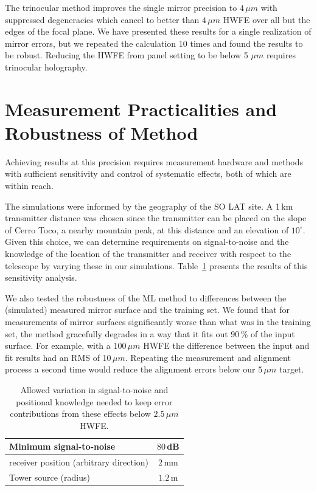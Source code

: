 The trinocular method improves the single mirror precision to $4\,\mu m$ with suppressed degeneracies  which cancel  to better than $4\,\mu m$ HWFE over all but the edges of the focal plane.   We have presented these results for a single realization of mirror errors, but we repeated the calculation 10 times and found the results to be robust.  Reducing the HWFE from panel setting to be below 5 $\mu m$ requires trinocular holography.


\section{Measurement Practicalities and Robustness of Method}
\label{sec:meas_method}
Achieving results at this precision requires measurement hardware and methods with sufficient sensitivity and control of systematic effects, both of which are within reach.

The simulations were informed by the geography of the SO LAT site.  A 1\,km transmitter distance was chosen since the transmitter can be placed on the slope of Cerro Toco, a nearby mountain peak, at this distance and an elevation of $10^\circ$.  Given this choice, we can determine requirements on signal-to-noise and the knowledge of the location of the transmitter and receiver with respect to the telescope by varying these in our simulations.  Table~\ref{tab:tols} presents the results of this sensitivity analysis. 

We also tested the robustness of the ML method to differences between the (simulated) measured mirror surface and the training set.  We found that for measurements of mirror surfaces significantly worse than what was in the training set, the method gracefully degrades in a way that it fits out 90\,\% of the input surface.  For example, with a 100\,$\mu m$ HWFE the difference between the input and fit results had an RMS of 10\,$\mu m$.  Repeating the measurement and alignment process a second time would reduce the alignment errors below our $5\,\mu m$ target. 

\begin{table}[!b]
\centering

\begin{tabular}{|l|c|}
\hline
Minimum signal-to-noise & $80$\,dB\\
\hline
receiver position (arbitrary direction) & $2$\,mm \\
\hline
Tower source (radius) & $1.2$\,m \\
\hline
\end{tabular}
\caption{Allowed variation in signal-to-noise and positional knowledge needed to keep error contributions from these effects  below $2.5\,\mu m$ HWFE.}
  \label{tab:tols}
\end{table}

